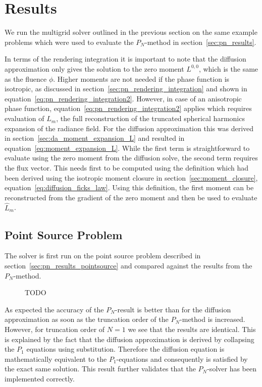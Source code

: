 \section{Results}
\label{sec:da_results}

We run the multigrid solver outlined in the previous section on the same example problems which were used to evaluate the $P_N$-method in section~\ref{sec:pn_results}.

In terms of the rendering integration it is important to note that the diffusion approximation only gives the solution to the zero moment $L^{0,0}$, which is the same as the fluence $\phi$. Higher moments are not needed if the phase function is isotropic, as discussed in section~\ref{sec:pn_rendering_integration} and shown in equation~\ref{eq:pn_rendering_integration2}. However, in case of an anisotropic phase function, equation~\ref{eq:pn_rendering_integration2} applies which requires evaluation of $\widehat{L}_m$, the full reconstruction of the truncated spherical harmonics expansion of the radiance field. For the diffusion approximation this was derived in section~\ref{sec:da_moment_expansion_L} and resulted in equation~\ref{eq:moment_expansion_L}. While the first term is straightforward to evaluate using the zero moment from the diffusion solve, the second term requires the flux vector. This needs first to be computed using the definition which had been derived using the isotropic moment closure in section~\ref{sec:moment_closure}, equation~\ref{eq:diffusion_ficks_law}. Using this definition, the first moment can be reconstructed from the gradient of the zero moment and then be used to evaluate $\widehat{L}_m$.

\subsection{Point Source Problem}
\label{sec:da_results_pointsource}

The solver is first run on the point source problem described in section~\ref{sec:pn_results_pointsource} and compared against the results from the $P_N$-method.
\begin{figure}[h]
\centering
{}
\caption{TODO}
\label{fig:da_results_pointsource_1}
\end{figure}

As expected the accuracy of the $P_N$-result is better than for the diffusion approximation as soon as the truncation order of the $P_N$-method is increased. However, for truncation order of $N=1$ we see that the results are identical. This is explained by the fact that the diffusion approximation is derived by collapsing the $P_1$ equations using substitution. Therefore the diffusion equation is mathematically equivalent to the $P_1$-equations and consequently is satisfied by the exact same solution. This result further validates that the $P_N$-solver has been implemented correctly.


